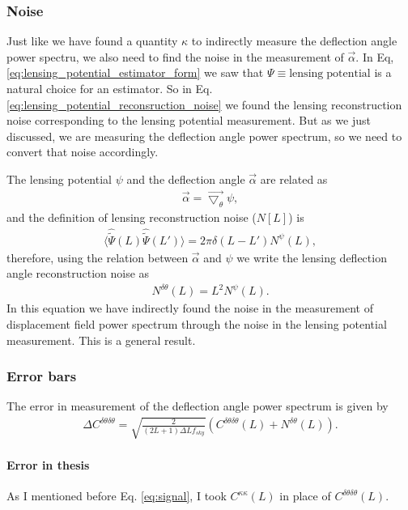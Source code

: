 \documentclass[12pt]{article}
\numberwithin{equation}{section}
\begin{document}
\subsubsection{Noise}
Just like we have found a quantity $ \kappa $ to indirectly measure the deflection angle power spectru, we also need to find the noise in the measurement of $ \vec{\alpha} $. In Eq, \eqref{eq:lensing_potential_estimator_form} we saw that $ \Psi \equiv \mathrm{lensing\;potential}$ is a natural choice for an estimator. So in Eq. \eqref{eq:lensing_potential_reconsruction_noise} we found the lensing reconstruction noise corresponding to the lensing potential measurement. But as we just discussed, we are measuring the deflection angle power spectrum, so we need to convert that noise accordingly.

The lensing potential $\psi$ and the deflection angle $ \vec{\alpha} $ are related as
\begin{align}
\vec{\alpha} = \vec{\bigtriangledown_\theta}\psi,
\end{align}
and the definition of lensing reconstruction noise ($ N[L] $) is
\begin{align}
\langle \hat{\tilde{\Psi}}(L)\hat{\tilde{\Psi}}(L') \rangle= 2\pi\delta(L - L') N^\psi(L),
\end{align}
therefore, using the relation between $ \vec{\alpha} $ and $\psi$ we write the lensing deflection angle reconstruction noise as
\begin{align}
N^{\delta\theta}(L) = L^2 N^\psi(L).\label{eq:general_displacement_field_reconstruction_noise}
\end{align}
In this equation we have indirectly found the noise in the measurement of displacement field power spectrum through the noise in the lensing potential measurement. This is a general result.

\subsubsection{Error bars}
The error in measurement of the deflection angle power spectrum is given by 
\begin{align}
\Delta C^{\delta\theta\delta\theta} = \sqrt{\frac{2}{(2L+1) \Delta L f_{sky}}}(C^{\delta\theta \delta \theta}(L) + N^{\delta\theta}(L)).
\end{align}
\paragraph{Error in thesis}
As I mentioned before Eq. \eqref{eq:signal}, I took $ C^{\kappa\kappa}(L) $ in place of $ C^{\delta\theta\delta\theta}(L) $.
\end{document}
